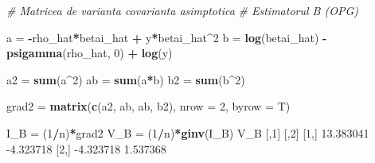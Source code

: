 \documentclass[]{article}
\newenvironment{Shaded}{\begin{snugshade}}{\end{snugshade}}
\newcommand{\CommentTok}[1]{\textcolor[rgb]{0.56,0.35,0.01}{\textit{#1}}}
\newcommand{\DataTypeTok}[1]{\textcolor[rgb]{0.13,0.29,0.53}{#1}}
\newcommand{\DecValTok}[1]{\textcolor[rgb]{0.00,0.00,0.81}{#1}}
\newcommand{\FloatTok}[1]{\textcolor[rgb]{0.00,0.00,0.81}{#1}}
\newcommand{\KeywordTok}[1]{\textcolor[rgb]{0.13,0.29,0.53}{\textbf{#1}}}
\newcommand{\NormalTok}[1]{#1}
\newcommand{\OperatorTok}[1]{\textcolor[rgb]{0.81,0.36,0.00}{\textbf{#1}}}
\newcommand{\StringTok}[1]{\textcolor[rgb]{0.31,0.60,0.02}{#1}}
\begin{document}
\begin{Shaded}
\begin{Highlighting}[]
\CommentTok{# Matricea de varianta covarianta asimptotica }
\CommentTok{# Estimatorul B (OPG)}

\NormalTok{a =}\StringTok{ }\OperatorTok{-}\NormalTok{rho_hat}\OperatorTok{*}\NormalTok{betai_hat }\OperatorTok{+}\StringTok{ }\NormalTok{y}\OperatorTok{*}\NormalTok{betai_hat}\OperatorTok{^}\DecValTok{2}
\NormalTok{b =}\StringTok{  }\KeywordTok{log}\NormalTok{(betai_hat) }\OperatorTok{-}\StringTok{ }\KeywordTok{psigamma}\NormalTok{(rho_hat, }\DecValTok{0}\NormalTok{) }\OperatorTok{+}\StringTok{ }\KeywordTok{log}\NormalTok{(y)}

\NormalTok{a2 =}\StringTok{ }\KeywordTok{sum}\NormalTok{(a}\OperatorTok{^}\DecValTok{2}\NormalTok{)}
\NormalTok{ab =}\StringTok{ }\KeywordTok{sum}\NormalTok{(a}\OperatorTok{*}\NormalTok{b)}
\NormalTok{b2 =}\StringTok{ }\KeywordTok{sum}\NormalTok{(b}\OperatorTok{^}\DecValTok{2}\NormalTok{)}

\NormalTok{grad2 =}\StringTok{ }\KeywordTok{matrix}\NormalTok{(}\KeywordTok{c}\NormalTok{(a2, ab, ab, b2), }\DataTypeTok{nrow =} \DecValTok{2}\NormalTok{, }\DataTypeTok{byrow =}\NormalTok{ T)}

\NormalTok{I_B =}\StringTok{ }\NormalTok{(}\DecValTok{1}\OperatorTok{/}\NormalTok{n)}\OperatorTok{*}\NormalTok{grad2}
\NormalTok{V_B =}\StringTok{ }\NormalTok{(}\DecValTok{1}\OperatorTok{/}\NormalTok{n)}\OperatorTok{*}\KeywordTok{ginv}\NormalTok{(I_B)}
\NormalTok{V_B}
\NormalTok{          [,}\DecValTok{1}\NormalTok{]      [,}\DecValTok{2}\NormalTok{]}
\NormalTok{[}\DecValTok{1}\NormalTok{,] }\FloatTok{13.383041} \FloatTok{-4.323718}
\NormalTok{[}\DecValTok{2}\NormalTok{,] }\FloatTok{-4.323718}  \FloatTok{1.537368}
\end{Highlighting}
\end{Shaded}
\end{document}
